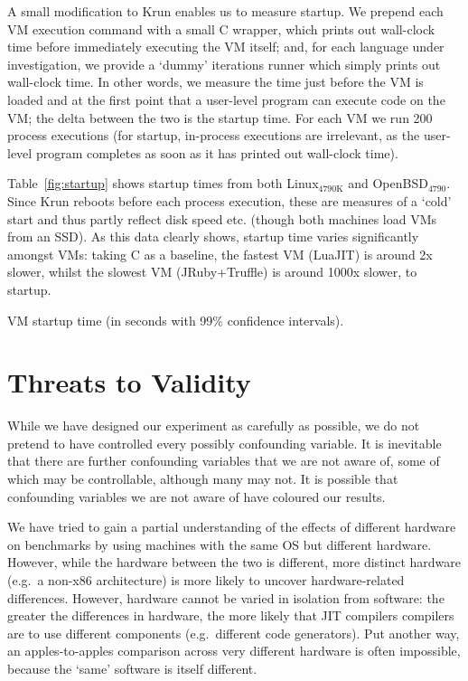 \documentclass[preprint,numbers,10pt]{sigplanconf}
\newcommand{\krun}{Krun\xspace}
\newcommand{\bencherthree}{Linux$_\mathrm{4790K}$\xspace}
\newcommand{\benchersix}{OpenBSD$_\mathrm{4790}$\xspace}
\begin{document}
A small modification to \krun enables us to measure startup. We prepend each VM
execution command with a small C wrapper, which prints out wall-clock time
before immediately executing the VM itself; and, for each language under
investigation, we provide a `dummy' iterations runner which simply prints out
wall-clock time. In other words, we measure the time just before the VM is loaded
and at the first point that a user-level program can execute code on the VM; the
delta between the two is the startup time. For each VM we run 200 process
executions (for startup, in-process executions are irrelevant,
as the user-level program completes as soon as it has printed out wall-clock
time).

Table~\ref{fig:startup} shows startup times from both \bencherthree and \benchersix. Since
\krun reboots before each process execution, these are measures of a `cold'
start and thus partly reflect disk speed etc. (though both machines load VMs
from an SSD). As this data clearly shows, startup time varies significantly amongst VMs:
taking C as a baseline, the fastest VM (LuaJIT) is around 2x slower, whilst the
slowest VM (JRuby+Truffle) is around 1000x slower, to startup.

\begin{table}[t]
\centering

\caption{VM startup time (in seconds with 99\% confidence intervals).}
\label{fig:startup}
\end{table}


\section{Threats to Validity}
\label{sec:threats}

While we have designed our experiment as carefully as possible, we do not
pretend to have controlled every possibly confounding variable. It
is inevitable that there are further confounding variables that
we are not aware of, some of which may be controllable, although many may not.
It is possible that confounding variables we are not aware of have
coloured our results.

We have tried to gain a partial understanding of the effects of different
hardware on benchmarks by using machines with the same OS but
different hardware. However, while the hardware between the two is
different, more distinct hardware (e.g.~a non-x86 architecture)
is more likely to uncover hardware-related differences.
However, hardware cannot be varied in isolation from software:
the greater the differences in hardware, the more likely that JIT compilers
compilers are to use different components (e.g.~different code generators).
Put another way, an apples-to-apples comparison across very different
hardware is often impossible, because the `same' software is itself different.
\end{document}
